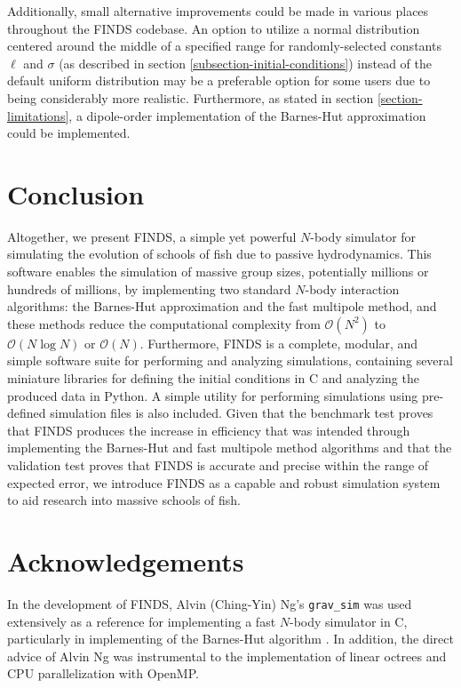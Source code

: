 \documentclass[letterpaper, 10pt, twoside]{LTJournalArticle}
\renewcommand{\O}{\mathcal{O}}
\begin{document}
Additionally, small alternative improvements could be made in various places
throughout the FINDS codebase. An option to utilize a normal distribution
centered around the middle of a specified range for randomly-selected constants
$\ell$ and $\sigma$ (as described in section
\ref{subsection-initial-conditions}) instead of the default uniform distribution
may be a preferable option for some users due to being considerably more
realistic. Furthermore, as stated in section \ref{section-limitations}, a
dipole-order implementation of the Barnes-Hut approximation could be
implemented.

\section{Conclusion}
\label{section-conclusion}

Altogether, we present FINDS, a simple yet powerful $N$-body simulator for
simulating the evolution of schools of fish due to passive hydrodynamics. This
software enables the simulation of massive group sizes, potentially millions or
hundreds of millions, by implementing two standard $N$-body interaction
algorithms: the Barnes-Hut approximation and the fast multipole method, and
these methods reduce the computational complexity from $\O(N^2)$ to $\O(N \log N)$
or $\O(N)$. Furthermore, FINDS is a complete, modular, and simple software suite
for performing and analyzing simulations, containing several miniature libraries
for defining the initial conditions in C and analyzing the produced data in
Python. A simple utility for performing simulations using pre-defined simulation
files is also included. Given that the benchmark test proves that FINDS produces
the increase in efficiency that was intended through implementing the Barnes-Hut
and fast multipole method algorithms and that the validation test proves that
FINDS is accurate and precise within the range of expected error, we introduce
FINDS as a capable and robust simulation system to aid research into massive
schools of fish.

\section{Acknowledgements}
\label{section-acknowledgements}

In the development of FINDS, Alvin (Ching-Yin) Ng's \verb|grav_sim| was used
extensively as a reference for implementing a fast $N$-body simulator in C,
particularly in implementing of the Barnes-Hut algorithm \cite{grav_sim_2025}.
In addition, the direct advice of Alvin Ng was instrumental to the
implementation of linear octrees and CPU parallelization with OpenMP.
\end{document}
